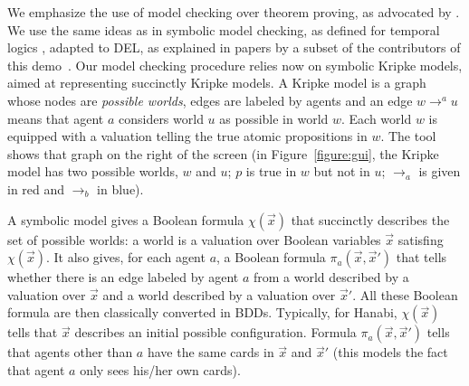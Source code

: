 We emphasize the use of model checking over theorem proving, as advocated by \citet{DBLP:conf/kr/HalpernV91}. We use the same ideas as in symbolic model checking, as defined for temporal logics \cite{DBLP:conf/lics/BurchCMDH90}, adapted to DEL, as explained in papers by a subset of the contributors of this demo~\cite{DBLP:conf/atal/CharrierS17,DBLP:conf/aiml/CharrierS18}. Our model checking procedure relies now on symbolic Kripke models, aimed at representing succinctly Kripke models. A Kripke model is a graph whose nodes are \emph{possible worlds}, edges are labeled by agents and an edge $w \rightarrow^a u$ means that agent $a$ considers world $u$ as possible in world $w$. Each world $w$ is equipped with a valuation telling the true atomic propositions in $w$. 
The tool shows that graph on the right of the screen (in Figure~\ref{figure:gui}, the Kripke model has two possible worlds, $w$ and $u$; $p$ is true in $w$ but not in $u$; $\rightarrow_a$ is given in red and $\rightarrow_b$ in blue). 


\newcommand{\succinctsetworlds}{\chi}
\newcommand{\succinctrelation}[1]{\pi_{#1}}
 A symbolic model gives a Boolean formula $\succinctsetworlds(\vec x)$ that succinctly  describes the set of possible worlds: a world is a valuation over Boolean variables $\vec x$ satisfing $\succinctsetworlds(\vec x)$. It also gives, for each agent $a$, a Boolean formula $\succinctrelation a(\vec x, \vec x')$ that tells whether there is an edge labeled by agent $a$ from a world described by a valuation over $\vec x$ and  a world described by a valuation over $\vec x'$. All these Boolean formula are then classically converted in BDDs. %
%
%
Typically, for Hanabi, $\succinctsetworlds(\vec x)$ tells that $\vec x$ describes an initial possible configuration. Formula $\succinctrelation a(\vec x, \vec x')$ tells that agents other than $a$ have the same cards in $\vec x$ and $\vec x'$ (this models the fact that agent $a$ only sees his/her own cards).


